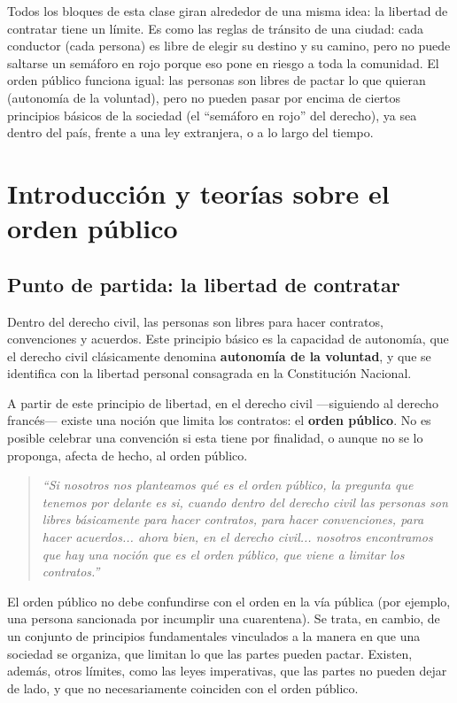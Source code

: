 \documentclass[12pt,oneside]{book}
\begin{document}
Todos los bloques de esta clase giran alrededor de una misma idea: la libertad de contratar tiene un límite. Es como las reglas de tránsito de una ciudad: cada conductor (cada persona) es libre de elegir su destino y su camino, pero no puede saltarse un semáforo en rojo porque eso pone en riesgo a toda la comunidad. El orden público funciona igual: las personas son libres de pactar lo que quieran (autonomía de la voluntad), pero no pueden pasar por encima de ciertos principios básicos de la sociedad (el ``semáforo en rojo'' del derecho), ya sea dentro del país, frente a una ley extranjera, o a lo largo del tiempo.

\chapter{Introducción y teorías sobre el orden público}

\section{Punto de partida: la libertad de contratar}

Dentro del derecho civil, las personas son libres para hacer contratos, convenciones y acuerdos. Este principio básico es la capacidad de autonomía, que el derecho civil clásicamente denomina \textbf{autonomía de la voluntad}, y que se identifica con la libertad personal consagrada en la Constitución Nacional.

A partir de este principio de libertad, en el derecho civil —siguiendo al derecho francés— existe una noción que limita los contratos: el \textbf{orden público}. No es posible celebrar una convención si esta tiene por finalidad, o aunque no se lo proponga, afecta de hecho, al orden público.

\begin{quote}
\itshape
``Si nosotros nos planteamos qué es el orden público, la pregunta que tenemos por delante es si, cuando dentro del derecho civil las personas son libres básicamente para hacer contratos, para hacer convenciones, para hacer acuerdos... ahora bien, en el derecho civil... nosotros encontramos que hay una noción que es el orden público, que viene a limitar los contratos.''
\end{quote}

El orden público no debe confundirse con el orden en la vía pública (por ejemplo, una persona sancionada por incumplir una cuarentena). Se trata, en cambio, de un conjunto de principios fundamentales vinculados a la manera en que una sociedad se organiza, que limitan lo que las partes pueden pactar. Existen, además, otros límites, como las leyes imperativas, que las partes no pueden dejar de lado, y que no necesariamente coinciden con el orden público.
\end{document}
